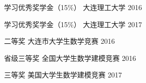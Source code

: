 


\vspace{-1.5mm}
\begin{cvhonors}

\cvhonor
{学习优秀奖学金（15\%）} %
{大连理工大学} %
{} %
{2016} %


\cvhonor
{学习优秀奖学金（15\%）} %
{大连理工大学} %
{} %
{2017} %


\cvhonor
{二等奖} %
{大连市大学生数学竞赛} %
{} %
{2016} %


\cvhonor
{省级三等奖} %
{全国大学生数学建模竞赛} %
{} %
{2016} %


\cvhonor
{三等奖} %
{美国大学生数学建模竞赛} %
{} %
{2017} %


\end{cvhonors}